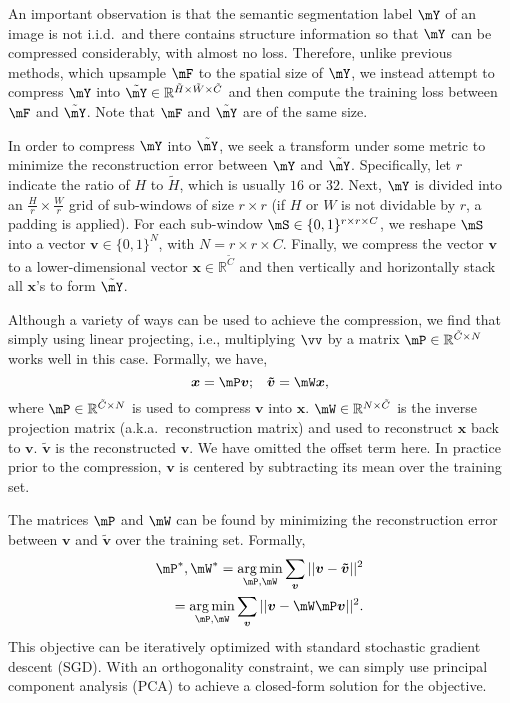 \documentclass[10pt,twocolumn,letterpaper]{article}
\def\Real{{\mathbb R}}
\def\R{{\mathbb R}}
\newcommand{\1}{{\mathbbm{1}}}
\begin{document}
An important observation is that the semantic segmentation label $\mY$
of an image is not i.i.d.\ and there contains structure information
so that $\mY$ can be compressed considerably, with almost no loss.
Therefore, unlike  previous methods, which upsample $\mF$ to the spatial size of $\mY$, we instead attempt to compress $\mY$ into $ \tilde{\mY} \in \Real^{\tilde{H} \times \tilde{W} \times \tilde{C}}$ and then compute the training loss between $\mF$ and $\tilde{\mY}$. Note that $\mF$ and $\tilde{\mY}$ are of  the same  size.



In order to compress $\mY$ into $\tilde{\mY}$,  we
seek a transform under some metric to minimize the reconstruction error between $ \mY  $ and  $\tilde{\mY}$.
Specifically, let $r$ indicate the ratio of $H$ to $\tilde{H}$, which is usually $16$ or $32$.
Next, $\mY$ is divided into an ${\frac{H}{r}} \times \frac{W}{r}$ grid of sub-windows of size $r \times r$ (if $H$ or $W$ is not dividable by $r$, a padding is applied).
For each sub-window $ \mS   \in \{0, 1\}^{r \times r \times C}$, we reshape $ \mS $ into a vector ${\boldsymbol{v}} \in \{0, 1\}^N$, with  $N = r \times r \times C$.
Finally, we compress the vector  $\boldsymbol{v}$ to a lower-dimensional  vector  $\boldsymbol{x} \in \Real^{ \tilde C }$ and then vertically and horizontally stack all $\boldsymbol{x}$'s to form $\tilde{\mY}$.

Although a variety of ways can be used to achieve the compression, we find that simply using linear projecting, i.e.,   multiplying $ \vv $ by a matrix $\mP  \in \Real^{\tilde{C} \times N}$ works well in this case. Formally, we have,
\begin{equation}
\boldsymbol{x} = \mP  \boldsymbol{v}; \;\;\;  \boldsymbol{\tilde{v}} = \mW\boldsymbol{x},
\end{equation}
where $\mP  \in \Real ^{\tilde{C} \times N}$ is used to compress $\boldsymbol{v}$ into $\boldsymbol{x}$. $ \mW \in \R^{N \times \tilde{C}}$ is the inverse projection matrix (a.k.a.\ reconstruction matrix) and used to reconstruct  $\boldsymbol{x}$ back to  $\boldsymbol{v}$. $\boldsymbol{\tilde{v}}$ is  the reconstructed $\boldsymbol{v}$. We have omitted the offset term here. In practice  prior to the compression, $\boldsymbol{v}$ is centered by subtracting its mean over the training set.


The matrices $\mP $ and $\mW$ can be found by minimizing the reconstruction error between $\boldsymbol{v}$ and $\boldsymbol{\tilde{v}}$ over the  training set. Formally,
\begin{equation}
\begin{aligned}
\mP ^*, \mW^* = \underset{\mP , \mW}{\arg\min} \sum_{\boldsymbol{v}} || \boldsymbol{v} - \boldsymbol{\tilde{v}} ||^2 \\
= \underset{ \mP, \mW}{\arg\min} \sum_{\boldsymbol{v}} || \boldsymbol{v} - \mW \mP \boldsymbol{v} ||^2.
\end{aligned}
\end{equation}
This objective can be iteratively optimized with standard stochastic gradient descent (SGD). With an  orthogonality constraint, we can simply use principal component analysis (PCA) \cite{wold1987principal} to achieve a closed-form solution for the objective.
\end{document}
